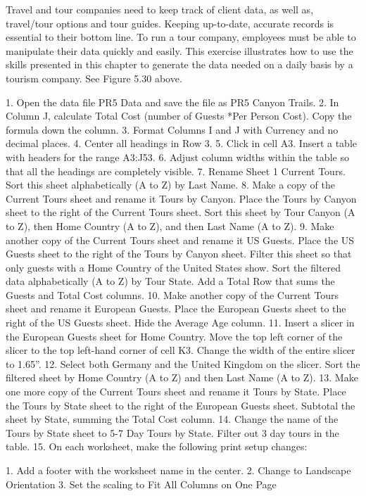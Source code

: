 Travel and tour companies need to keep track of client data, as well as, travel/tour options and tour
guides. Keeping up-to-date, accurate records is essential to their bottom line. To run a tour company,
employees must be able to manipulate their data quickly and easily. This exercise illustrates how to use
the skills presented in this chapter to generate the data needed on a daily basis by a tourism company.
See Figure 5.30 above.

1. Open the data file PR5 Data and save the file as PR5 Canyon Trails.
2. In Column J, calculate Total Cost (number of Guests *Per Person Cost). Copy the formula down the column.
3. Format Columns I and J with Currency and no decimal places.
4. Center all headings in Row 3.
5. Click in cell A3. Insert a table with headers for the range A3:J53.
6. Adjust column widths within the table so that all the headings are completely visible.
7. Rename Sheet 1 Current Tours. Sort this sheet alphabetically (A to Z) by Last Name.
8. Make a copy of the Current Tours sheet and rename it Tours by Canyon. Place the Tours by Canyon sheet to the right of the Current Tours sheet. Sort this sheet by Tour Canyon (A to Z),
then Home Country (A to Z), and then Last Name (A to Z).
9. Make another copy of the Current Tours sheet and rename it US Guests. Place the US Guests
sheet to the right of the Tours by Canyon sheet. Filter this sheet so that only guests with a Home
Country of the United States show. Sort the filtered data alphabetically (A to Z) by Tour State.
Add a Total Row that sums the Guests and Total Cost columns.
10. Make another copy of the Current Tours sheet and rename it European Guests. Place the
European Guests sheet to the right of the US Guests sheet. Hide the Average Age column.
11. Insert a slicer in the European Guests sheet for Home Country. Move the top left corner of the
slicer to the top left-hand corner of cell K3. Change the width of the entire slicer to 1.65''.
12. Select both Germany and the United Kingdom on the slicer. Sort the filtered sheet by Home
Country (A to Z) and then Last Name (A to Z).
13. Make one more copy of the Current Tours sheet and rename it Tours by State. Place the Tours
by State sheet to the right of the European Guests sheet. Subtotal the sheet by State, summing
the Total Cost column.
14. Change the name of the Tours by State sheet to 5-7 Day Tours by State. Filter out 3 day tours in the table.
15. On each worksheet, make the following print setup changes:

1. Add a footer with the worksheet name in the center.
2. Change to Landscape Orientation
3. Set the scaling to Fit All Columns on One Page

